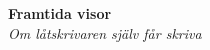 \begin{center}
    \vspace*{1.5cm}
    {\fontsize{20}{20}\textbf{Framtida visor}}\\
    \vspace{0.7cm}
    {\fontsize{12}{12}\textit{Om låtskrivaren själv får skriva}}
  
    \end{center}
    \noBackground

    \newpage
    \resetBackground


\empty
\empty
